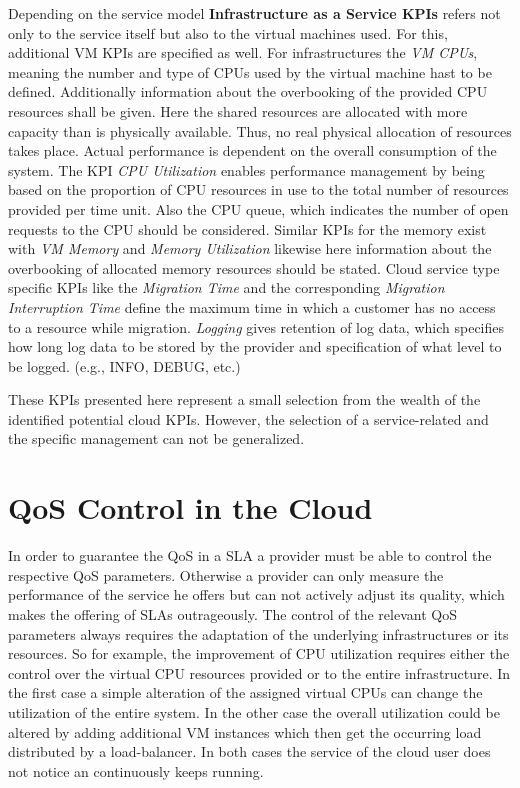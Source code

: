 Depending on the service model \textbf{Infrastructure as a Service KPIs} refers not only to the service itself but also to the  virtual machines used. For this, additional VM KPIs are specified as well. For infrastructures the 
\emph{VM CPUs}, meaning the number and type of  CPUs used by the virtual machine hast to be defined. Additionally information about the overbooking of the provided CPU resources shall be given. Here the shared resources are allocated with more capacity than is physically available. Thus, no real physical allocation of resources takes place. Actual performance is dependent on the overall consumption of the system.  The KPI \emph{CPU Utilization} enables performance management by being based on the proportion of CPU resources in use to the total number of resources provided per time unit. Also the CPU queue, which indicates the number of open requests to the CPU should be considered. Similar KPIs for the memory exist with \emph{VM Memory} and \emph{Memory Utilization} likewise here information about the overbooking of allocated memory resources should be stated. Cloud service type specific KPIs like the \emph{Migration Time} and the corresponding \emph{Migration Interruption Time}  define the maximum time in which a customer has no access to a resource while migration. \emph{Logging}  gives retention of log data, which specifies how long log data to be stored by the provider and specification of what level to be logged. (e.g., INFO, DEBUG, etc.)

These KPIs presented here represent a small selection from the wealth of the identified potential cloud KPIs. However, the selection of a service-related and the specific management can not be generalized.

 \section{QoS Control in the Cloud}
In order to guarantee the QoS in a SLA a provider must be able to control the respective QoS parameters. Otherwise a provider can only measure the performance of the service he offers  but can not actively adjust its quality, which makes the offering of SLAs outrageously. The control of the relevant QoS parameters always requires the adaptation of the underlying infrastructures or its resources. So for example, the improvement of CPU utilization requires either  the control over the virtual CPU resources provided or to the entire infrastructure. In the first case a simple alteration of the assigned virtual CPUs can change the utilization of the entire system. In the other case the overall utilization could be altered by adding additional VM instances which then get the occurring load distributed by a load-balancer. In both cases the service of the cloud user does not notice an continuously keeps running. 



